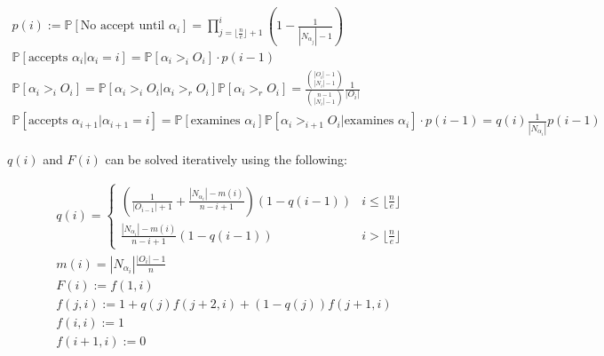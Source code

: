 \documentclass{article}
\newcommand{\prob}{\mathbb{P}}
\begin{document}
\begin{gather*}
p(i):= \prob[\text{No accept until }\alpha_{i}] = \prod_{j=\lfloor\frac{n}{e}\rfloor + 1}^{i} \left( 1-\frac{1}{|N_{\alpha_j}| - 1} \right) \\
\prob[\text{accepts }\alpha_i | \alpha_i = i] = \prob[\alpha_i >_i O_i]\cdot p(i-1) \\
\prob[\alpha_i >_i O_i] = \prob[\alpha_i >_i O_i | \alpha_i >_r O_i] \prob[\alpha_i >_r O_i] = \frac{\binom{|O_i|-1}{|N_i|-1}}{\binom{n-1}{|N_i|-1}} \frac{1}{|O_i|} \\
\prob[\text{accepts }\alpha_{i+1} | \alpha_{i+1} = i] = \prob[\text{examines } \alpha_i] \prob[\alpha_i >_{i+1} O_i | \text{examines } \alpha_i] \cdot  p(i-1) = q(i) \frac{1}{|N_{\alpha_i}|} p(i-1)
\end{gather*} 

$q(i)$ and $F(i)$ can be solved iteratively using the following:

\begin{gather*}
q(i)= \begin{cases}
\left(\frac{1}{|O_{i-1}|+1} + \frac{|N_{\alpha_i}|-m(i)}{n-i+1}\right)(1-q(i-1)) &i\leq\lfloor\frac{n}{e}\rfloor \\
\frac{|N_{\alpha_i}|-m(i)}{n-i+1}(1-q(i-1)) &i>\lfloor\frac{n}{e}\rfloor
\end{cases} \\
m(i) = |N_{\alpha_i}|\frac{|O_i|-1}{n} \\
F(i) := f(1,i)\\
f(j,i) := 1+q(j)f(j+2,i) + (1-q(j))f(j+1,i)\\
f(i,i) := 1\\
f(i+1,i) := 0
\end{gather*}
\end{document}
